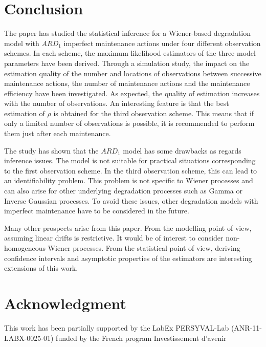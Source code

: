 \section{Conclusion}
\label{section:conc}

The paper has studied the statistical inference for a Wiener-based degradation model with $ARD_1$ imperfect maintenance actions under four different observation schemes. In each scheme, the maximum likelihood estimators of the three model parameters have been derived. Through a simulation study, the impact on the estimation quality of the number and locations of observations between successive maintenance actions, the number of maintenance actions and the maintenance efficiency have been investigated. As expected, the quality of estimation increases with the number of observations. An interesting feature is that the best estimation of $\rho$ is obtained for the third observation scheme. This means that if only a limited number of observations is possible, it is recommended to perform them just after each maintenance.

The study has shown that the $ARD_1$ model has some drawbacks as regards inference issues. The model is not suitable for practical situations corresponding to the first observation scheme. In the third observation scheme, this can lead to an identifiability problem. This problem is not specific to Wiener processes and can also arise for other underlying degradation processes such as Gamma or Inverse Gaussian processes. To avoid these issues, other degradation models with imperfect maintenance have to be considered in the future. 

Many other prospects arise from this paper. From the modelling point of view, assuming linear drifts is restrictive. It would be of interest to consider non-homogeneous Wiener processes. From the statistical point of view, deriving confidence intervals and asymptotic properties of the estimators are interesting extensions of this work.

\section*{Acknowledgment }
This work has been partially supported by the LabEx PERSYVAL-Lab (ANR-11-LABX-0025-01) funded by the French program Investissement d’avenir

